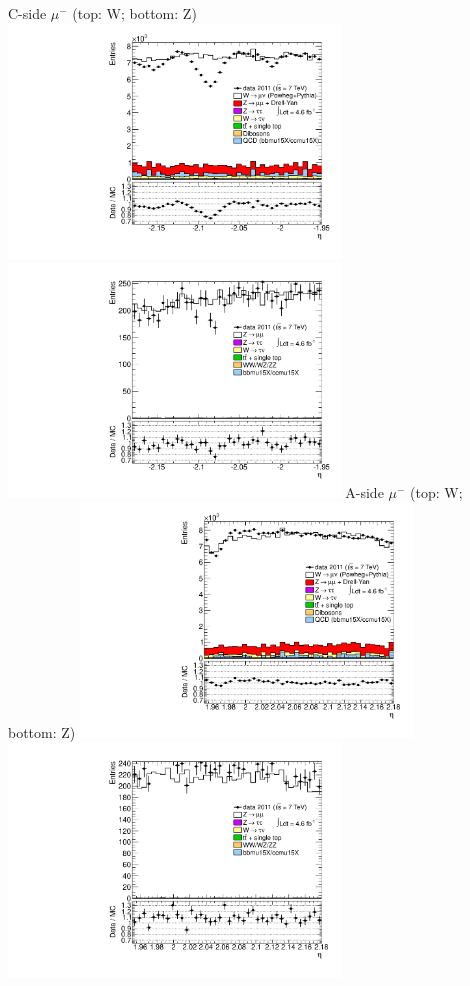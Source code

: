  {
\colb[T]
C-side $\mu^{-}$ (top: W; bottom: Z)
\centering
\includegraphics[width=0.66\textwidth]{dates/20130306/figures/etaphi/W_10_C_stack_l_eta_NEG} \\
\includegraphics[width=0.66\textwidth]{dates/20130306/figures/etaphi/Ztinv_10_C_stack_lN_eta_ALL.pdf}
A-side $\mu^{-}$ (top: W; bottom: Z)
\centering
\includegraphics[width=0.66\textwidth]{dates/20130306/figures/etaphi/W_10_A_stack_l_eta_NEG} \\
\includegraphics[width=0.66\textwidth]{dates/20130306/figures/etaphi/Ztinv_10_A_stack_lN_eta_ALL.pdf} 
\cole
}

